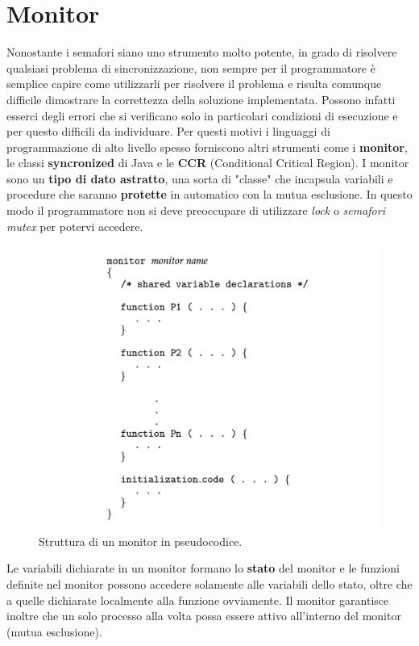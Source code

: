 \section{Monitor}
Nonostante i semafori siano uno strumento molto potente, in grado di risolvere qualsiasi problema di sincronizzazione, non sempre per il programmatore è semplice capire come utilizzarli per risolvere il problema e risulta comunque difficile dimostrare la correttezza della soluzione implementata. Possono infatti esserci degli errori che si verificano solo in particolari condizioni di esecuzione e per questo difficili da individuare.
Per questi motivi i linguaggi di programmazione di alto livello spesso forniscono altri strumenti come i \textbf{monitor}, le classi \textbf{syncronized} di Java e le \textbf{CCR} (Conditional Critical Region).
I monitor sono un \textbf{tipo di dato astratto}, una sorta di "classe" che incapsula variabili e procedure che saranno \textbf{protette} in automatico con la mutua esclusione. In questo modo il programmatore non si deve preoccupare di utilizzare \emph{lock} o \emph{semafori mutex} per potervi accedere.
\begin{figure}[h]
	\includegraphics[width=\textwidth]{Pictures/monitorPseudocode.png}
	\caption{Struttura di un monitor in pseudocodice.}
\end{figure}
Le variabili dichiarate in un monitor formano lo \textbf{stato} del monitor e le funzioni definite nel monitor possono accedere solamente alle variabili dello stato, oltre che a quelle dichiarate localmente alla funzione ovviamente. Il monitor garantisce inoltre che un solo processo alla volta possa essere attivo all'interno del monitor (mutua esclusione).
